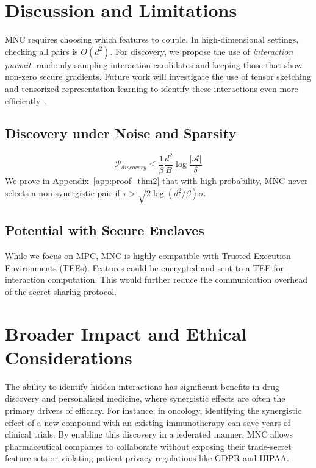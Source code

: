 \documentclass{article}
\theoremstyle{plain}
\theoremstyle{definition}
\begin{document}
\section{Discussion and Limitations}
\label{sec:discussion}
MNC requires choosing which features to couple. In high-dimensional settings, checking all pairs is $O(d^2)$. For discovery, we propose the use of \emph{interaction pursuit}: randomly sampling interaction candidates and keeping those that show non-zero secure gradients. Future work will investigate the use of tensor sketching and tensorized representation learning to identify these interactions even more efficiently~\cite{zhang2024tensorized,ji2024emerging}.

\subsection{Discovery under Noise and Sparsity}
\begin{equation}
    \mathcal{P}_{discovery} \le \frac{1}{\beta} \frac{d^2}{B} \log \frac{|\mathcal{A}|}{\delta}
\end{equation}
We prove in Appendix~\ref{app:proof_thm2} that with high probability, MNC never selects a non-synergistic pair if $\tau > \sqrt{2 \log(d^2/\beta)} \sigma$.

\subsection{Potential with Secure Enclaves}
While we focus on MPC, MNC is highly compatible with Trusted Execution Environments (TEEs). Features could be encrypted and sent to a TEE for interaction computation. This would further reduce the communication overhead of the secret sharing protocol.

\section{Broader Impact and Ethical Considerations}
The ability to identify hidden interactions has significant benefits in drug discovery and personalised medicine, where synergistic effects are often the primary drivers of efficacy. For instance, in oncology, identifying the synergistic effect of a new compound with an existing immunotherapy can save years of clinical trials. By enabling this discovery in a federated manner, MNC allows pharmaceutical companies to collaborate without exposing their trade-secret feature sets or violating patient privacy regulations like GDPR and HIPAA.
\end{document}

